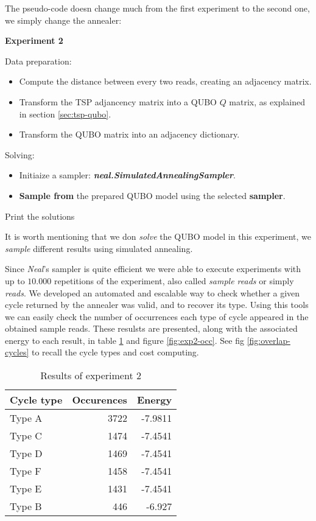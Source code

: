 The pseudo-code doesn change much from the first experiment to the second one, we simply change the annealer:

\begin{algorithm}
	\caption*{\textbf{Experiment 2}}
	
	Data preparation:
	\begin{itemize}
		\item Compute the distance between every two reads, creating an adjacency matrix.
		\item Transform the TSP adjancency matrix into a QUBO $Q$ matrix, as explained in section \ref{sec:tsp-qubo}.
		\item Transform the QUBO matrix into an adjacency dictionary.
	\end{itemize}
	
	Solving:
	\begin{itemize}
		\item Initiaize a sampler: \textbf{\emph{neal.SimulatedAnnealingSampler}}.
		\item \textbf{Sample from} the prepared QUBO model using the selected \textbf{sampler}.
	\end{itemize}
	
	Print the solutions
\end{algorithm}

It is worth mentioning that we don \emph{solve} the QUBO model in this experiment, we \emph{sample} different results using simulated annealing.

Since \emph{Neal}'s sampler is quite efficient we were able to execute experiments with up to $10.000$ repetitions of the experiment, also called \emph{sample reads} or simply \emph{reads}. We developed an automated and escalable way to check whether a given cycle returned by the annealer was valid, and to recover its type. Using this tools we can easily check the number of occurrences each type of cycle appeared in the obtained sample reads. These resulsts are presented, along with the associated energy to each result, in table \ref{tab:exp2} and figure \ref{fig:exp2-occ}. See fig \ref{fig:overlap-cycles} to recall the cycle types and cost computing.

\begin{table}[H]
	\centering
	\begin{tabular}{lrr}
		\textbf{Cycle type} & \textbf{Occurences} & \textbf{Energy} \\
		\hline
		Type A	& 3722	& -7.9811	\\
		Type C	& 1474	& -7.4541	\\
		Type D	& 1469	& -7.4541	\\
		Type F	& 1458	& -7.4541	\\
		Type E	& 1431	& -7.4541	\\
		Type B	& 446	& -6.927                             
	\end{tabular}
	\caption{Results of experiment 2}
	\label{tab:exp2}
\end{table}

